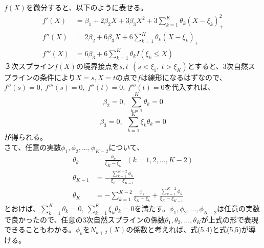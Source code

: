\documentclass{jsarticle}
\begin{document}
$f(X)$を微分すると、以下のように表せる。
\begin{align*}
f'(X)&=\beta_1+2\beta_2 X+3\beta_3 X^2+3\sum_{k=1}^{K}\theta_k(X-\xi_k)_+^2\\
f''(X)&=2\beta_2 +6\beta_3 X+6\sum_{k=1}^{K}\theta_k(X-\xi_k)_+\\
f'''(X)&=6\beta_3+6\sum_{k=1}^{K}\theta_k I(\xi_k\leq X)
\end{align*}
３次スプライン$f(X)$の境界接点を$s,t\ \ (s<\xi_1,\ t>\xi_K)$とすると、3次自然スプラインの条件により$X=s, X=t$の点で$f$は線形になるはずなので、$f''(s)=0,\ f'''(s)=0,\ f''(t)=0,\ f'''(t)=0$を代入すれば、
\[\beta_2=0,\ \ \sum_{k=1}^{K}\theta_k=0\]
\[\beta_3=0,\ \ \sum_{k=1}^{K}\xi_k\theta_k=0\]
が得られる。\\
さて、任意の実数$\phi_1,\phi_2,...,\phi_{K-2}$について、
\begin{align*}
\theta_k&=\frac{\phi_k}{\xi_K-\xi_k}\ \ \ (k=1,2,...,K-2)\\
\theta_{K-1}&=-\frac{\sum_{k=1}^{K-2}\phi_k}{\xi_K-\xi_{K-1}}\\
\theta_K&=-\sum_{k=1}^{K-2}\frac{\phi_k}{\xi_K-\xi_k}+\frac{\sum_{k=1}^{K-2}\phi_k}{\xi_K-\xi_{K-1}}
\end{align*}
とおけば、$\sum_{k=1}^{K}\theta_k=0,\ \sum_{k=1}^{K}\xi_k\theta_k=0$を満たす。$\phi_1,\phi_2,...,\phi_{K-2}$は任意の実数で良かったので、任意の3次自然スプラインの係数$\theta_1,\theta_2,...,\theta_K$が上式の形で表現できることもわかる。$\phi_k$を$N_{k+2}(X)$の係数と考えれば、式(5.4)と式(5,5)が導ける。
\end{document}
